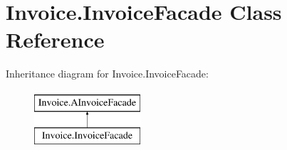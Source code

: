 \hypertarget{class_invoice_1_1_invoice_facade}{}\section{Invoice.\+Invoice\+Facade Class Reference}
\label{class_invoice_1_1_invoice_facade}
Inheritance diagram for Invoice.\+Invoice\+Facade\+:\begin{figure}[H]
\begin{center}
\leavevmode
\includegraphics[height=2.000000cm]{class_invoice_1_1_invoice_facade}
\end{center}
\end{figure}
